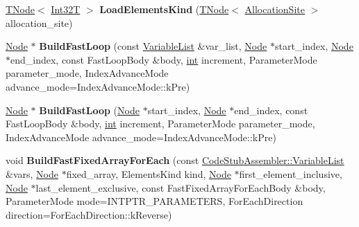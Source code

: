 \begin{DoxyCompactItemize}
\mbox{\hyperlink{classv8_1_1internal_1_1compiler_1_1TNode}{T\+Node}}$<$ \mbox{\hyperlink{structv8_1_1internal_1_1Int32T}{Int32T}} $>$ {\bfseries Load\+Elements\+Kind} (\mbox{\hyperlink{classv8_1_1internal_1_1compiler_1_1TNode}{T\+Node}}$<$ \mbox{\hyperlink{classv8_1_1internal_1_1AllocationSite}{Allocation\+Site}} $>$ allocation\+\_\+site)
\item 
\mbox{\label{classv8_1_1internal_1_1CodeStubAssembler_a0bd3c3caf0cc62fc80232f3e39c85460}} 
\mbox{\hyperlink{classv8_1_1internal_1_1compiler_1_1Node}{Node}} $\ast$ {\bfseries Build\+Fast\+Loop} (const \mbox{\hyperlink{classv8_1_1internal_1_1ZoneVector}{Variable\+List}} \&var\+\_\+list, \mbox{\hyperlink{classv8_1_1internal_1_1compiler_1_1Node}{Node}} $\ast$start\+\_\+index, \mbox{\hyperlink{classv8_1_1internal_1_1compiler_1_1Node}{Node}} $\ast$end\+\_\+index, const Fast\+Loop\+Body \&body, \mbox{\hyperlink{classint}{int}} increment, Parameter\+Mode parameter\+\_\+mode, Index\+Advance\+Mode advance\+\_\+mode=Index\+Advance\+Mode\+::k\+Pre)
\item 
\mbox{\label{classv8_1_1internal_1_1CodeStubAssembler_af72a89c60a6d4955dbe8807b50f7c8a1}} 
\mbox{\hyperlink{classv8_1_1internal_1_1compiler_1_1Node}{Node}} $\ast$ {\bfseries Build\+Fast\+Loop} (\mbox{\hyperlink{classv8_1_1internal_1_1compiler_1_1Node}{Node}} $\ast$start\+\_\+index, \mbox{\hyperlink{classv8_1_1internal_1_1compiler_1_1Node}{Node}} $\ast$end\+\_\+index, const Fast\+Loop\+Body \&body, \mbox{\hyperlink{classint}{int}} increment, Parameter\+Mode parameter\+\_\+mode, Index\+Advance\+Mode advance\+\_\+mode=Index\+Advance\+Mode\+::k\+Pre)
\item 
\mbox{\label{classv8_1_1internal_1_1CodeStubAssembler_acbe5c09e85b0026ad47095f45ca88080}} 
void {\bfseries Build\+Fast\+Fixed\+Array\+For\+Each} (const \mbox{\hyperlink{classv8_1_1internal_1_1ZoneVector}{Code\+Stub\+Assembler\+::\+Variable\+List}} \&vars, \mbox{\hyperlink{classv8_1_1internal_1_1compiler_1_1Node}{Node}} $\ast$fixed\+\_\+array, Elements\+Kind kind, \mbox{\hyperlink{classv8_1_1internal_1_1compiler_1_1Node}{Node}} $\ast$first\+\_\+element\+\_\+inclusive, \mbox{\hyperlink{classv8_1_1internal_1_1compiler_1_1Node}{Node}} $\ast$last\+\_\+element\+\_\+exclusive, const Fast\+Fixed\+Array\+For\+Each\+Body \&body, Parameter\+Mode mode=I\+N\+T\+P\+T\+R\+\_\+\+P\+A\+R\+A\+M\+E\+T\+E\+RS, For\+Each\+Direction direction=For\+Each\+Direction\+::k\+Reverse)

\end{DoxyCompactItemize}
